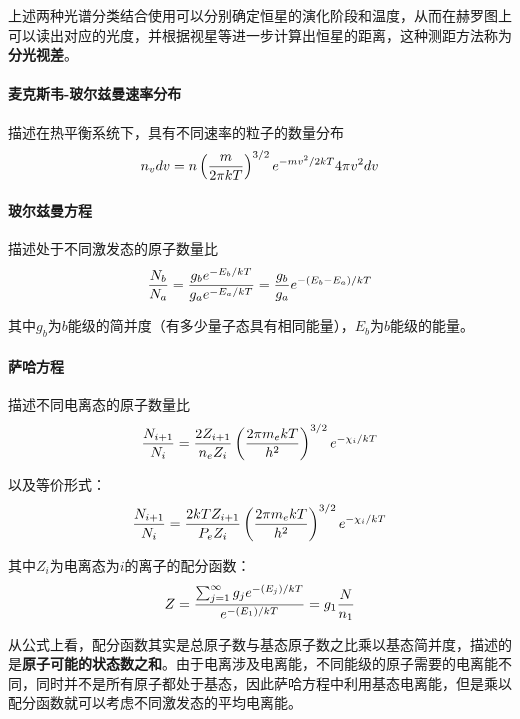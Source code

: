 \documentclass[openany]{ctexbook}
\begin{document}
上述两种光谱分类结合使用可以分别确定恒星的演化阶段和温度，从而在赫罗图上可以读出对应的光度，并根据视星等进一步计算出恒星的距离，这种测距方法称为\textbf{分光视差}。

\paragraph{麦克斯韦-玻尔兹曼速率分布}
描述在热平衡系统下，具有不同速率的粒子的数量分布
\begin{equation}
  n_v dv=n\left({m\over 2\pi k T}\right)^{3/2}e^{-mv^2/2kT}4\pi v^2 dv
  \label{eq:maxwell}
\end{equation}

\paragraph{玻尔兹曼方程}
描述处于不同激发态的原子数量比
\begin{equation}
  {N_b\over N_a}={g_b e^{-E_b/kT}\over g_a e^{-E_a/kT}}={g_b\over g_a}e^{-(E_b-E_a)/kT}
  \label{eq:boltzmann}
\end{equation}

其中$g_b$为$b$能级的简并度（有多少量子态具有相同能量），$E_b$为$b$能级的能量。

\paragraph{萨哈方程}
描述不同电离态的原子数量比
\begin{equation}
  {N_{i+1}\over N_i}={2Z_{i+1}\over n_e Z_i}\left({2\pi m_e kT\over h^2}\right)^{3/2} e^{-\chi_i/kT}
  \label{eq:saha}
\end{equation}

以及等价形式：
\begin{equation}
  {N_{i+1}\over N_i}={2kTZ_{i+1}\over P_e Z_i}\left({2\pi m_e kT\over h^2}\right)^{3/2} e^{-\chi_i/kT}
\end{equation}

其中$Z_i$为电离态为$i$的离子的配分函数：
\begin{equation}
  Z={\sum_{j=1}^\infty g_j e^{-(E_j)/kT}\over e^{-(E_1)/kT}}=g_1 {N\over n_1}
\end{equation}

从公式上看，配分函数其实是总原子数与基态原子数之比乘以基态简并度，描述的是\textbf{原子可能的状态数之和}。由于电离涉及电离能，不同能级的原子需要的电离能不同，同时并不是所有原子都处于基态，因此萨哈方程中利用基态电离能，但是乘以配分函数就可以考虑不同激发态的平均电离能。
\end{document}
